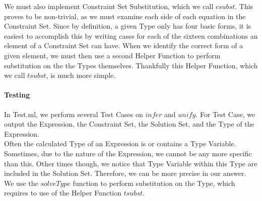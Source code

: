 \documentclass{article}
\begin{document}
We must also implement Constraint Set Substitution, which we call $csubst$. This proves to be non-trivial, as we must examine each side of each equation in the Constraint Set. Since by definition, a given Type only has four basic forms, it is easiest to accomplish this by writing cases for each of the sixteen combinations an element of a Constraint Set can have. When we identify the correct form of a given element, we must then use a second Helper Function to perform substitution on the the Types themselves. Thankfully this Helper Function, which we call $tsubst$, is much more simple. \\

\paragraph{Testing}

In Test.ml, we perform several Test Cases on $infer$ and $unify$. For Test Case, we output the Expression, the Constraint Set, the Solution Set, and the Type of the Expression. \\

Often the calculated Type of an Expression is or contains a Type Variable. Sometimes, due to the nature of the Expression, we cannot be any more specific than this. Other times though, we notice that Type Variable within this Type are included in the Solution Set. Therefore, we can be more precise in our answer. We use the $solveType$ function to perform substitution on the Type, which requires to use of the Helper Function $tsubst$.
\end{document}
